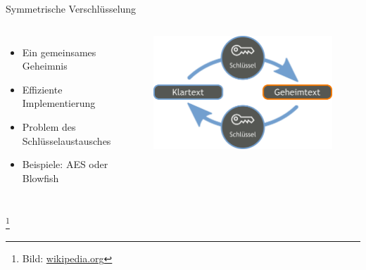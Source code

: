 \documentclass[10pt]{beamer}
\newcommand\blfootnote[1]{%
	\begingroup
	\renewcommand\thefootnote{}\footnote{#1}%
	\addtocounter{footnote}{-1}%
	\endgroup
}
\begin{document}
%
%
\begin{frame}[fragile]{Symmetrische Verschlüsselung}
\begin{columns}[T,c,onlytextwidth]
	\begin{itemize}
		\item Ein gemeinsames Geheimnis
		\item Effiziente Implementierung
		\item Problem des Schlüsselaustausches
		\item Beispiele: AES oder Blowfish 
	\end{itemize}
	\begin{figure}
		\includegraphics[width=1\textwidth]{images/sym}
	\end{figure}
\end{columns}
\blfootnote{Bild: \href{https://de.wikipedia.org/wiki/Symmetrisches_Kryptosystem}{wikipedia.org}}
\end{frame}
\end{document}
